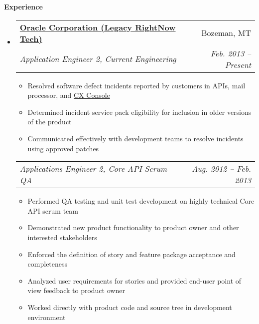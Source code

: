 \documentclass[letterpaper,11pt]{article}
\makeatletter
\newcommand{\resitem}[1]{\item #1 \vspace{-2pt}}
\newcommand{\resheading}[1]{{\large \colorbox{mygrey}{\begin{minipage}{\textwidth}{\textbf{#1 \vphantom{p\^{E}}}}\end{minipage}}}}
\newcommand{\ressubheading}[4]{
\begin{tabular*}{6.5in}{l@{\extracolsep{\fill}}r}
		\textbf{#1} & #2 \\
		\textit{#3} & \textit{#4} \\
\end{tabular*}\vspace{-6pt}}
\newcommand{\ressubsubheading}[2]{
\begin{tabular*}{6.5in}{l@{\extracolsep{\fill}}r}
		\textit{#1} & \textit{#2} \\
\end{tabular*}\vspace{-6pt}}
\makeatother
\begin{document}
\resheading{Experience}
	\begin{itemize}
		\item 
			\ressubheading{\href{http://www.oracle.com}{Oracle Corporation (Legacy RightNow Tech)}}{Bozeman, MT}
				{Application Engineer 2, Current Engineering}{Feb. 2013 -- Present}
				{ \footnotesize
				\begin{itemize}
					\resitem{Resolved software defect incidents reported by customers in APIs, mail processor, and \href{http://www.oracle.com/us/solutions/customer-experience/oracle-customer-experience/overview/index.html}{CX Console}}
					\resitem{Determined incident service pack eligibility for inclusion in older versions of the product}
					\resitem{Communicated effectively with development teams to resolve incidents using approved patches}
				\end{itemize}
				}

			\ressubsubheading{Applications Engineer 2, Core API Scrum QA}{Aug. 2012 -- Feb. 2013}
				{ \footnotesize
				\begin{itemize}
					\resitem{Performed QA testing and unit test development on highly technical Core API scrum team}
					\resitem{Demonstrated new product functionality to product owner and other interested stakeholders}
					\resitem{Enforced the definition of story and feature package acceptance and completeness}
					\resitem{Analyzed user requirements for stories and provided end-user point of view feedback to product owner}
                                        \resitem{Worked directly with product code and source tree in development environment}
				\end{itemize}
				}


\end{itemize}
\end{document}
